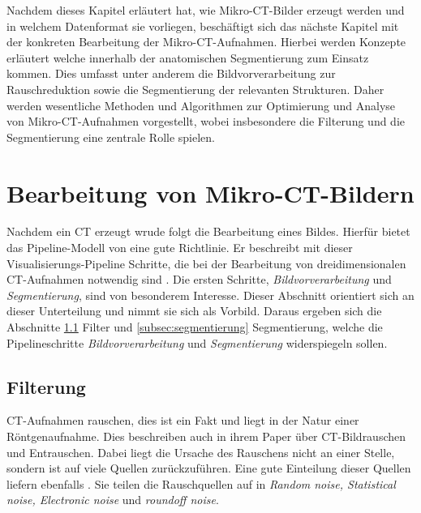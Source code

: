 Nachdem dieses Kapitel erläutert hat, wie Mikro-\ac{CT}-Bilder erzeugt werden
und in welchem Datenformat sie vorliegen, beschäftigt sich das nächste Kapitel mit
der konkreten Bearbeitung der Mikro-\ac{CT}-Aufnahmen. Hierbei werden Konzepte erläutert
welche innerhalb der anatomischen Segmentierung zum Einsatz kommen. Dies umfasst
unter anderem die Bildvorverarbeitung zur Rauschreduktion sowie die
Segmentierung der relevanten Strukturen. Daher werden wesentliche Methoden und Algorithmen
zur Optimierung und Analyse von Mikro-\ac{CT}-Aufnahmen vorgestellt, wobei insbesondere
die Filterung und die Segmentierung eine zentrale Rolle spielen.

\pagebreak

\section{Bearbeitung von Mikro-CT-Bildern}
\label{sec:bildbearbeitung} Nachdem ein \ac{CT} erzeugt wrude folgt die Bearbeitung
eines Bildes. Hierfür bietet das Pipeline-Modell von \citet[S.~50]{handels2000} eine
gute Richtlinie. Er beschreibt mit dieser Visualisierungs-Pipeline Schritte, die
bei der Bearbeitung von dreidimensionalen \ac{CT}-Aufnahmen notwendig sind
\citep[vgl.][S.~50]{handels2000}. Die ersten Schritte, \textit{Bildvorverarbeitung}
und \textit{Segmentierung}, sind von besonderem Interesse. Dieser Abschnitt orientiert
sich an dieser Unterteilung und nimmt sie sich als Vorbild. Daraus ergeben sich
die Abschnitte \ref{subsec:filter} Filter und \ref{subsec:segmentierung}
Segmentierung, welche die Pipelineschritte \textit{Bildvorverarbeitung} und
\textit{Segmentierung} widerspiegeln sollen.

\subsection{Filterung}
\label{subsec:filter} \ac{CT}-Aufnahmen rauschen, dies ist ein Fakt und liegt in
der Natur einer Röntgenaufnahme. Dies beschreiben auch \citet[K.~3]{diwakar2018}
in ihrem Paper über \ac{CT}-Bildrauschen und Entrauschen. Dabei liegt die Ursache
des Rauschens nicht an einer Stelle, sondern ist auf viele Quellen
zurückzuführen. Eine gute Einteilung dieser Quellen liefern ebenfalls \citet[K.~3]{diwakar2018}.
Sie teilen die Rauschquellen auf in \textit{Random noise, Statistical noise,
Electronic noise} und \textit{roundoff noise}.


